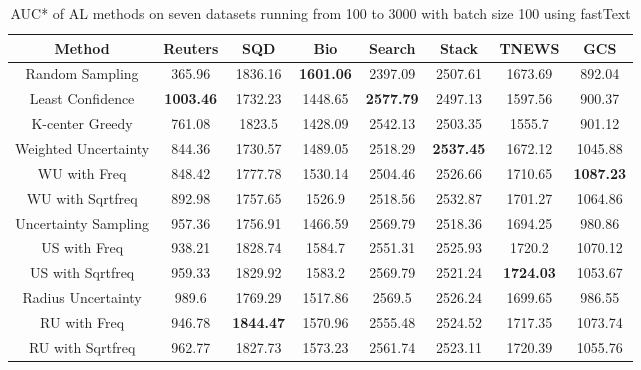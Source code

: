 \begin{table}[th]
	\centering
	\scriptsize
	\begin{tabular}{cccccccc}
		\toprule
		Method & Reuters & SQD & Bio & Search & Stack & TNEWS & GCS \\ \hline
		Random Sampling & 365.96 & 1836.16 & \textbf{1601.06} &  2397.09 & 2507.61 & 1673.69  & 892.04  \\
		Least Confidence & \textbf{1003.46} & 1732.23 & 1448.65 &  \textbf{2577.79} & 2497.13 &  1597.56 & 900.37 \\
		K-center Greedy & 761.08 & 1823.5 & 1428.09 & 2542.13 & 2503.35 & 1555.7  & 901.12 \\ \hline
		Weighted Uncertainty & 844.36 & 1730.57 & 1489.05 & 2518.29 & \textbf{2537.45} & 1672.12 & 1045.88 \\
		WU with Freq & 848.42 & 1777.78 & 1530.14 & 2504.46 & 2526.66 & 1710.65 & \textbf{1087.23} \\
		WU with Sqrtfreq & 892.98 & 1757.65 & 1526.9 & 2518.56 & 2532.87 & 1701.27 & 1064.86\\ \hline
		Uncertainty Sampling & 957.36 & 1756.91 & 1466.59& 2569.79 & 2518.36 & 1694.25 & 980.86\\
		US with Freq & 938.21 &  1828.74 & 1584.7 & 2551.31 & 2525.93 & 1720.2 & 1070.12\\
		US with Sqrtfreq & 959.33 & 1829.92 & 1583.2 & 2569.79 & 2521.24 & \textbf{1724.03} & 1053.67\\ \hline
		Radius Uncertainty & 989.6 & 1769.29 & 1517.86 & 2569.5 & 2526.24 & 1699.65 & 986.55\\
		RU with Freq & 946.78 & \textbf{1844.47} & 1570.96 & 2555.48 & 2524.52 & 1717.35 & 1073.74  \\
		RU with Sqrtfreq & 962.77 & 1827.73 & 1573.23 & 2561.74 & 2523.11 & 1720.39 & 1055.76\\
		\hline
	\end{tabular}
\caption{AUC* of AL methods on seven datasets running from 100 to 3000 with batch size 100 using fastText}
\label{table:auc_ft}
\end{table}


